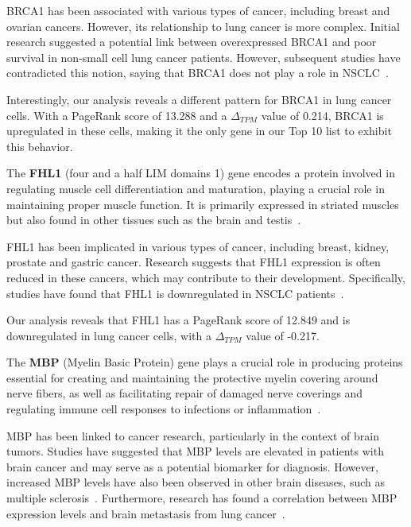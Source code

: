 BRCA1 has been associated with various types of cancer, including breast and ovarian cancers\cite{Lee2020BRCA1}.
However, its relationship to lung cancer is more complex.
Initial research suggested a potential link between overexpressed BRCA1 and
poor survival in non-small cell lung cancer patients\cite{Rosell2007BRCA1}.
However, subsequent studies have contradicted this notion,
saying that BRCA1 does not play a role in NSCLC~\cite{Gachechiladze2012BRCA1,Lee2020BRCA1}.

Interestingly, our analysis reveals a different pattern for BRCA1 in lung cancer cells.
With a PageRank score of 13.288 and a $\Delta_{TPM}$ value of 0.214,
BRCA1 is upregulated in these cells, making it the only gene in our Top 10 list to exhibit this behavior.
\newline

The \textbf{FHL1} (four and a half LIM domains 1) gene encodes a protein
involved in regulating muscle cell differentiation and maturation,
playing a crucial role in maintaining proper muscle function.
It is primarily expressed in striated muscles but also found in other tissues such as the brain and testis~\cite{Storey2020FHL1}.

FHL1 has been implicated in various types of cancer, including breast, kidney, prostate and gastric cancer.
Research suggests that FHL1 expression is often reduced in these cancers,
which may contribute to their development\cite{Li2008FHL1, Sakashita2008FHL1}.
Specifically, studies have found that FHL1 is downregulated in NSCLC patients~\cite{Niu2012FHL1}.

Our analysis reveals that FHL1 has a PageRank score of 12.849 and is downregulated in lung cancer cells,
with a $\Delta_{TPM}$ value of -0.217.
\newline

The \textbf{MBP} (Myelin Basic Protein) gene plays a crucial role in producing proteins essential for creating and
maintaining the protective myelin covering around nerve fibers, as well as
facilitating repair of damaged nerve coverings and regulating immune cell responses to infections or inflammation~\cite{Nye1995MBP}.

MBP has been linked to cancer research, particularly in the context of brain tumors.
Studies have suggested that MBP levels are elevated in patients with brain cancer and may serve as a potential biomarker for diagnosis.
However, increased MBP levels have also been observed in other brain diseases, such as multiple sclerosis~\cite{Zavialova2017MBP}.
Furthermore, research has found a correlation between MBP expression levels and brain metastasis from lung cancer~\cite{Nakagawa1994MBP}.

